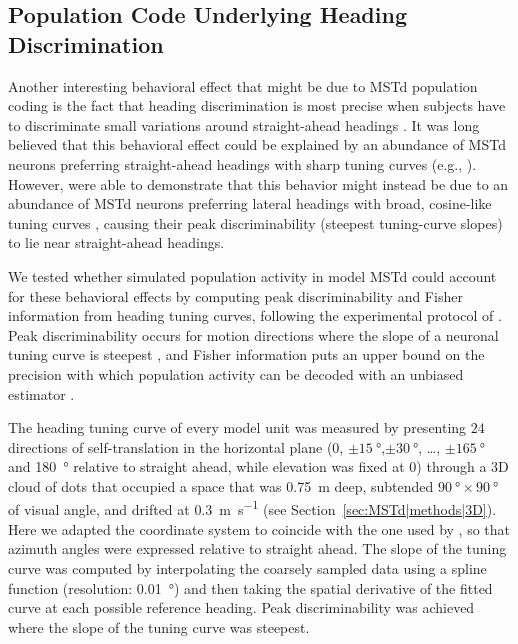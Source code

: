 \subsection{Population Code Underlying Heading Discrimination}
\label{sec:MSTd|results|discrimination}
Another interesting behavioral effect that might be due to \ac{MSTd}
population coding is the fact that heading discrimination is most precise
when subjects have to discriminate small variations around straight-ahead
headings \citep{CrowellBanks1993,Gu2010}. It was long believed that this
behavioral effect could be explained by an abundance of \ac{MSTd} neurons
preferring straight-ahead headings with sharp tuning curves (e.g., 
\cite{DuffyWurtz1995}). However, \cite{Gu2010} were able to demonstrate that
this behavior might instead be due to an abundance of \ac{MSTd} neurons
preferring lateral headings with broad, cosine-like tuning curves 
\citep{Lappe1996,Gu2006}, causing their peak discriminability (steepest
tuning-curve slopes) to lie near straight-ahead headings.

We tested whether simulated population activity in model \ac{MSTd} could 
account for these behavioral effects by computing peak discriminability 
and Fisher information from heading tuning curves, following the experimental
protocol of \cite{Gu2010}. Peak discriminability occurs for motion directions
where the slope of a neuronal tuning curve is steepest
\citep{SeungSompolinsky1993,PurushothamanBradley2005,JazayeriMovshon2006},
and Fisher information puts an upper bound on the precision with which 
population activity can be decoded with an unbiased estimator 
\citep{SeungSompolinsky1993,Pouget1998}.

The heading tuning curve of every model unit was measured by presenting 
$24$ directions of self-translation in the horizontal plane 
($0$, $\pm \SI{15}{\degree}$,$\pm \SI{30}{\degree}$, \ldots, 
$\pm \SI{165}{\degree}$ and \SI{180}{\degree} relative to straight ahead, 
while elevation was fixed at $0$) through a 3D cloud of dots that occupied
a space that was \SI{0.75}{\meter} deep, subtended 
$\SI{90}{\degree} \times \SI{90}{\degree}$ of visual angle, and drifted 
at \SI{0.3}{\meter\per\second} (see Section~\ref{sec:MSTd|methods|3D}).
Here we adapted the coordinate system to coincide with the one used by 
\cite{Gu2010}, so that azimuth angles were expressed relative to straight 
ahead. The slope of the tuning curve was computed by interpolating the 
coarsely sampled data using a spline function (resolution: \SI{0.01}{\degree})
and then taking the spatial derivative of the fitted curve at each possible
reference heading. Peak discriminability was achieved where the slope of the 
tuning curve was steepest.

